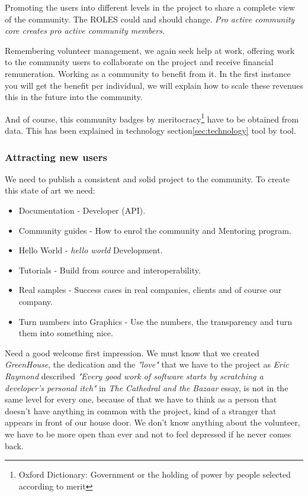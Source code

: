 \documentclass[11pt]{scrartcl}
\begin{document}
\par Promoting the users into different levels in the project to share a complete view of the community. The ROLES could and should change. \emph{Pro active community core creates pro active community members}.

\par Remembering volunteer management, we again seek help at work, offering work to the community users to collaborate on the project and receive financial remuneration. Working as a community to benefit from it. In the first instance you will get the benefit per individual, we will explain how to scale these revenues this in the future into the community.

\par And of course, this community badges by meritocracy\footnote{Oxford Dictionary: Government or the holding of power by people selected according to merit} have to be obtained from data. This has been explained in technology section\ref{sec:technology} tool by tool.


\subsubsection{Attracting new users}
\label{sub:new-users}

\par We need to publish a consistent and solid project to the community. To create this state of art we need:

\begin{itemize}
	\item Documentation - Developer (API). 
	\item Community guides - How to enrol the community and Mentoring program.
	\item Hello World - \emph{hello world} Development.
	\item Tutorials - Build from source and interoperability.
	\item Real samples - Success cases in real companies, clients and of course our company.
	\item Turn numbers into Graphics - Use the numbers, the transparency and turn them into something nice.
\end{itemize}

\par Need a good welcome first impression. We must know that we created \emph{GreenHouse}, the dedication and the \emph{"love"} that we have to the project as \emph{Eric Raymond} described \emph{"Every good work of software starts by scratching a developer's personal itch"} in \emph{The Cathedral and the Bazaar} essay\cite{cath-bazaar}, is not in the same level for every one, because of that we have to think as a person that doesn't have anything in common with the project, kind of a stranger that appears in front of our house door. We don't know anything about the volunteer, we have to be more open than ever and not to feel depressed if he never comes back.
\end{document}
